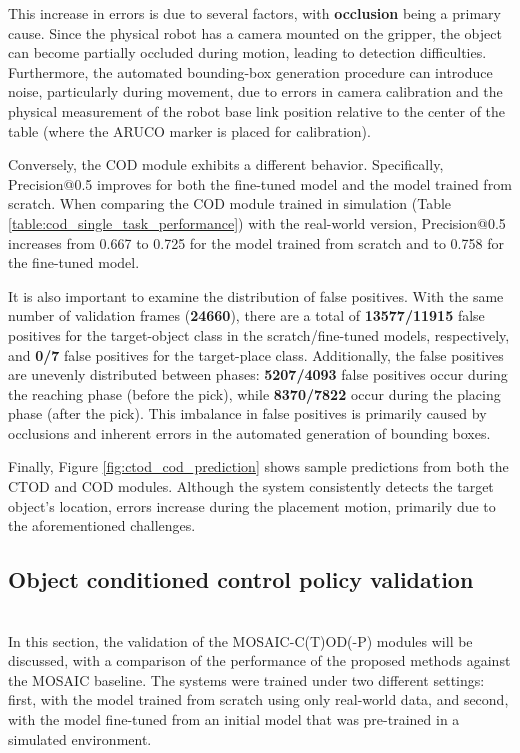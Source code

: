 This increase in errors is due to several factors, with \textbf{occlusion} being a primary cause. Since the physical robot has a camera mounted on the gripper, the object can become partially occluded during motion, leading to detection difficulties. Furthermore, the automated bounding-box generation procedure can introduce noise, particularly during movement, due to errors in camera calibration and the physical measurement of the robot base link position relative to the center of the table (where the ARUCO marker is placed for calibration).

Conversely, the COD module exhibits a different behavior. Specifically, Precision@0.5 improves for both the fine-tuned model and the model trained from scratch. When comparing the COD module trained in simulation (Table \ref{table:cod_single_task_performance}) with the real-world version, Precision@0.5 increases from 0.667 to 0.725 for the model trained from scratch and to 0.758 for the fine-tuned model. 

It is also important to examine the distribution of false positives. With the same number of validation frames (\textbf{24660}), there are a total of \textbf{13577/11915} false positives for the target-object class in the scratch/fine-tuned models, respectively, and \textbf{0/7} false positives for the target-place class. Additionally, the false positives are unevenly distributed between phases: \textbf{5207/4093} false positives occur during the reaching phase (before the pick), while \textbf{8370/7822} occur during the placing phase (after the pick). This imbalance in false positives is primarily caused by occlusions and inherent errors in the automated generation of bounding boxes.

Finally, Figure \ref{fig:ctod_cod_prediction} shows sample predictions from both the CTOD and COD modules. Although the system consistently detects the target object's location, errors increase during the placement motion, primarily due to the aforementioned challenges.




\subsection{Object conditioned control policy validation}\mbox{}\\
In this section, the validation of the MOSAIC-C(T)OD(-P) modules will be discussed, with a comparison of the performance of the proposed methods against the MOSAIC baseline. The systems were trained under two different settings: first, with the model trained from scratch using only real-world data, and second, with the model fine-tuned from an initial model that was pre-trained in a simulated environment.

